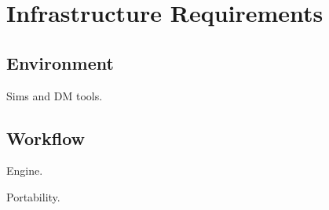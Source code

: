 \section{Infrastructure Requirements}
\label{sec:twinkles1:infrastructure}



\subsection{Environment}

Sims and DM tools.


\subsection{Workflow}

Engine.

Portability.

